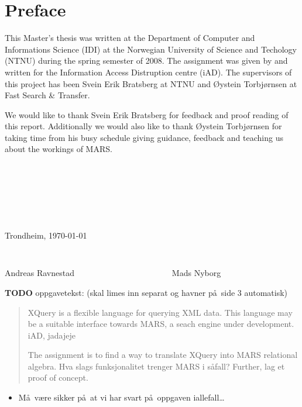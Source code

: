 \chapter*{Preface}

This Master's thesis was written at the Department of Computer and Informations Science (IDI) at the
Norwegian University of Science and Techology (NTNU) during the spring semester of 2008. The assignment was given
by and written for the Information Access Distruption centre (iAD). The supervisors of this project has been Svein
Erik Bratsberg at NTNU and \O ystein Torbj\o rnsen at Fast Search \& Transfer.

We would like to thank Svein Erik Bratsberg for feedback and proof reading of this report. Additionally we
would also like to thank \O ystein Torbj\o rnsen for taking time from his busy schedule giving guidance, feedback
and teaching us about the workings of MARS.

\begin{verbatim}







\end{verbatim}
\begin{center}

Trondheim, \today

\begin{verbatim}


\end{verbatim}
Andreas Ravnestad \verb!                      ! Mads Nyborg
\end{center}

\textbf{\LARGE TODO} oppgavetekst: (skal limes inn separat og havner p\aa~side 3 automatisk)

\begin{quote}
XQuery is a flexible language for querying XML data. This language may be a
suitable interface towards MARS, a seach engine under development. iAD, jadajeje

The assignment is to find a way to translate XQuery into MARS relational
algebra. Hva slags funksjonalitet trenger MARS i s\aa fall? Further, lag et
proof of concept.
\end{quote}

\begin{itemize}
  \item M\aa~v\ae re sikker p\aa~at vi har svart p\aa~oppgaven iallefall\ldots
\end{itemize}
